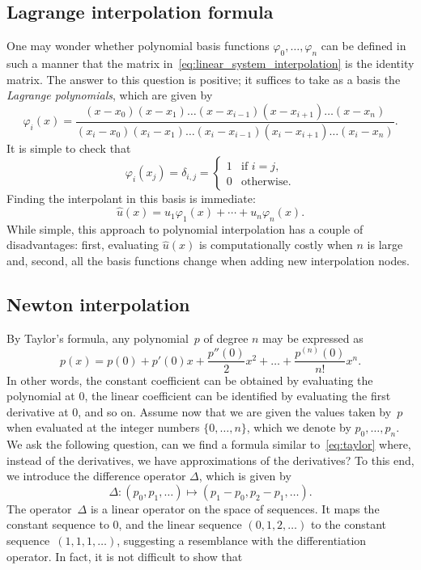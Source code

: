\subsection{Lagrange interpolation formula}
One may wonder whether polynomial basis functions $\varphi_0, \dotsc, \varphi_n$ can be defined in such a manner that
the matrix in~\eqref{eq:linear_system_interpolation} is the identity matrix.
The answer to this question is positive;
it suffices to take as a basis the \emph{Lagrange polynomials},
which are given by
\[
    \varphi_{i}(x)
    = \frac{(x - x_0) (x - x_1) \dotsc (x - x_{i-1}) (x - x_{i+1}) \dotsc (x - x_n)}
    {(x_i - x_0) (x_i - x_1) \dotsc (x_i - x_{i-1}) (x_i - x_{i+1}) \dotsc (x_i - x_n)}.
\]
It is simple to check that
\[
    \varphi_i(x_j) =
    \delta_{i,j} =
    \begin{cases}
        1 & \text{if $i = j$}, \\
        0 & \text{otherwise.}
    \end{cases}
\]
Finding the interpolant in this basis is immediate:
\[
    \widehat u(x) = u_1 \varphi_1(x) + \dotsb + u_n \varphi_n(x).
\]
While simple, this approach to polynomial interpolation has a couple of disadvantages:
first, evaluating $\widehat u(x)$ is computationally costly when $n$ is large and,
second, all the basis functions change when adding new interpolation nodes.

\subsection{Newton interpolation}
By Taylor's formula,
any polynomial~$p$ of degree $n$ may be expressed as
\begin{equation}
    \label{eq:taylor}
    p(x) = p(0) + p'(0) x + \frac{p''(0)}{2} x^2 + \dotsc + \frac{p^{(n)}(0)}{n!} x^n.
\end{equation}
In other words, the constant coefficient can be obtained by evaluating the polynomial at 0,
the linear coefficient can be identified by evaluating the first derivative at 0,
and so on.
Assume now that we are given the values taken by~$p$ when evaluated at the integer numbers $\{0, \dotsc, n\}$,
which we denote by $p_0, \dotsc, p_n$.
We ask the following question,
can we find a formula similar to~\eqref{eq:taylor} where,
instead of the derivatives, we have approximations of the derivatives?
To this end, we introduce the difference operator $\Delta$,
which is given by
\[
    \Delta: (p_0, p_1, \dotsc) \mapsto (p_1 - p_0, p_2 - p_1, \dotsc).
\]
The operator~$\Delta$ is a linear operator on the space of sequences.
It maps the constant sequence to 0,
and the linear sequence $(0, 1, 2, \dotsc)$ to the constant sequence~$(1, 1, 1, \dotsc)$,
suggesting a resemblance with the differentiation operator.
In fact,
it is not difficult to show that

